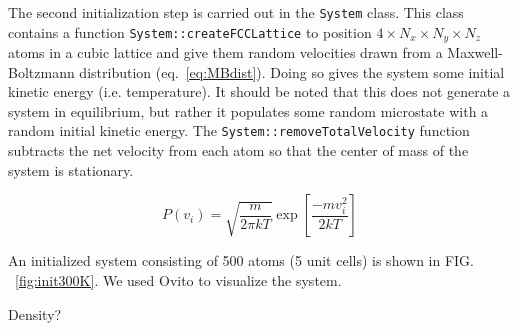 \documentclass[10pt,showpacs,preprintnumbers,footinbib,amsmath,amssymb,aps,prl,twocolumn,groupedaddress,superscriptaddress,showkeys]{revtex4-1}
\begin{document}
The second initialization step is carried out in the \texttt{System}
class. This class contains a function \texttt{System::createFCCLattice}
to position $4 \times N_x \times N_y \times N_z$ atoms in a cubic lattice
and give them random velocities drawn from a Maxwell-Boltzmann
distribution (eq.~\ref{eq:MBdist}). Doing so gives the system some
initial kinetic energy (i.e. temperature). It should be noted that this
does not generate a system
in equilibrium, but rather it populates some random microstate with a
random initial kinetic energy. The \texttt{System::removeTotalVelocity}
function subtracts the net velocity from each atom so that the center of
mass of the system is stationary.

\begin{equation}
	P(v_i) = \sqrt{\frac{m}{2 \pi k T}} \exp \left [ \frac{-m v_i ^2}{2kT} \right ]
	\label{eq:MBdist}
\end{equation}

An initialized system consisting of 500 atoms (5 unit cells) is shown in FIG.
~\ref{fig:init300K}. We used Ovito to visualize the system.

Density?
\end{document}
